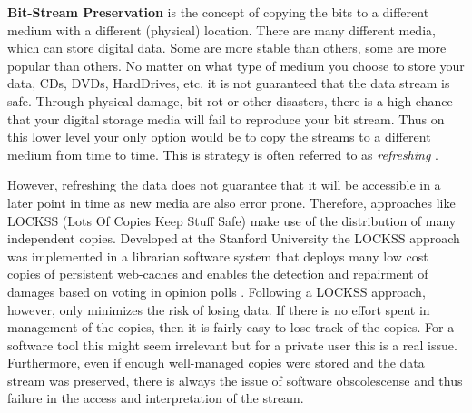 \textbf{Bit-Stream Preservation}
is the concept of copying the bits to a different medium with a different (physical) location. There are many different media, which can store digital data. Some are more stable than others, some are more popular than others. No matter on what type of medium you choose to store your data, CDs, DVDs, HardDrives, etc. it is not guaranteed that the data stream is safe. Through physical damage, bit rot or other disasters, there is a high chance that your digital storage media will fail to reproduce your bit stream. Thus on this lower level your only option would be to copy the streams to a different medium from time to time. This is strategy is often referred to as \textit{refreshing} \cite{Lee:2002:SOTADP}.

However, refreshing the data does not guarantee that it will be accessible in a later point in time as new media are also error prone. Therefore, approaches like LOCKSS (Lots Of Copies Keep Stuff Safe) make use of the distribution of many independent copies. Developed at the Stanford University the LOCKSS approach was implemented in a librarian software system that deploys many low cost copies of persistent web-caches and enables the detection and repairment of damages based on voting in opinion polls \cite{reich2001lpw, Maniatis:2003:PPR:1165389.945451}.
Following a LOCKSS approach, however, only minimizes the risk of losing data. If there is no effort spent in management of the copies, then it is fairly easy to lose track of the copies. For a software tool this might seem irrelevant but for a private user this is a real issue. Furthermore, even if enough well-managed copies were stored and the data stream was preserved, there is always the issue of software obscolescense and thus failure in the access and interpretation of the stream. \newline

